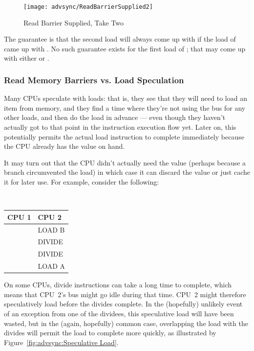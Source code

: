 \begin{figure}[htb]
\begin{center}
\texttt{[image: advsync/ReadBarrierSupplied2]}
\end{center}
\caption{Read Barrier Supplied, Take Two}
\end{figure}

The guarantee is that the second load will always come up with 
if the
load of  came up with .
No such guarantee exists for the first load of
; that may come up with either  or .

\subsubsection{Read Memory Barriers vs. Load Speculation}
\label{sec:advsync:Read Memory Barriers vs. Load Speculation}

Many CPUs speculate with loads: that is, they see that they will need to
load an item from memory, and they find a time where they're not using
the bus for any other loads, and then do the load in advance --- even though
they haven't actually got to that point in the instruction execution
flow yet.
Later on, this potentially permits the actual load instruction to
complete immediately because the CPU already has the value on hand.

It may turn out that the CPU didn't actually need the value (perhaps because a
branch circumvented the load) in which case it can discard the value or just
cache it for later use.
For example, consider the following:

\vspace{5pt}
\begin{minipage}[t]{\columnwidth}
\tt
\scriptsize
\begin{tabular}{l|p{1.5in}}
	CPU 1 &		CPU 2 \\
	\hline
		&	LOAD B \\
		&	DIVIDE \\
		&	DIVIDE \\
		&	LOAD A \\
\end{tabular}
\end{minipage}
\vspace{5pt}

On some CPUs, divide instructions can take a long time to complete,
which means that CPU~2's bus might go idle during that time.
CPU~2 might therefore speculatively load  before the divides
complete.
In the (hopefully) unlikely event of an exception from one of the dividees,
this speculative load will have been wasted, but in the (again, hopefully)
common case, overlapping the load with the divides will permit the load
to complete more quickly, as illustrated by
Figure~\ref{fig:advsync:Speculative Load}.

